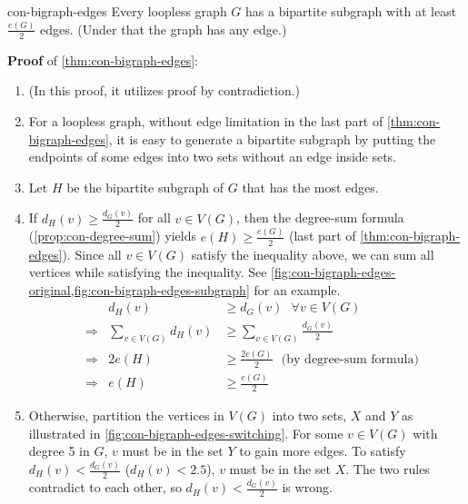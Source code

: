\documentclass[../src/handouts/main.tex]{subfiles}
\begin{document}
\begin{theorem}{}{con-bigraph-edges}
  Every loopless graph $G$ has a bipartite subgraph with at least $\frac{e(G)}{2}$ edges. (Under that the graph has any edge.)
\end{theorem}

\textbf{Proof} of \cref{thm:con-bigraph-edges}:
\begin{enumerate}
  \item (In this proof, it utilizes proof by contradiction.)
  \item For a loopless graph, without edge limitation in the last part of \cref{thm:con-bigraph-edges}, it is easy to generate a bipartite subgraph by putting the endpoints of some edges into two sets without an edge inside sets.
  \item Let $H$ be the bipartite subgraph of $G$ that has the most edges.
  \item If $d_H(v) \geq \frac{d_G(v)}{2}$ for all $v \in V(G)$, then the degree-sum formula (\cref{prop:con-degree-sum}) yields $e(H) \geq \frac{e(G)}{2}$ (last part of \cref{thm:con-bigraph-edges}). Since all $v \in V(G)$ satisfy the inequality above, we can sum all vertices while satisfying the inequality. See \cref{fig:con-bigraph-edges-original,fig:con-bigraph-edges-subgraph} for an example.
        \begin{align*}
           &             & d_H(v)                    & \geq d_G(v) \ \ \ \forall v \in V(G)                       \\
           & \Rightarrow & \sum _{v \in V(G)} d_H(v) & \geq \sum _{v \in V(G)} \frac{d_G(v)}{2}                   \\
           & \Rightarrow & 2 e(H)                    & \geq \frac{2 e(G)}{2} \ \ \ \text{(by degree-sum formula)} \\
           & \Rightarrow & e(H)                      & \geq \frac{e(G)}{2}
        \end{align*}
  \item Otherwise, partition the vertices in $V(G)$ into two sets, $X$ and $Y$ as illustrated in \cref{fig:con-bigraph-edges-switching}. For some $v \in V(G)$ with degree 5 in $G$, $v$ must be in the set $Y$ to gain more edges. To satisfy $d_H(v) < \frac{d_G(v)}{2}$ ($d_H(v) < 2.5$), $v$ must be in the set $X$. The two rules contradict to each other, so $d_H(v) < \frac{d_G(v)}{2}$ is wrong.
\end{enumerate}
\end{document}
